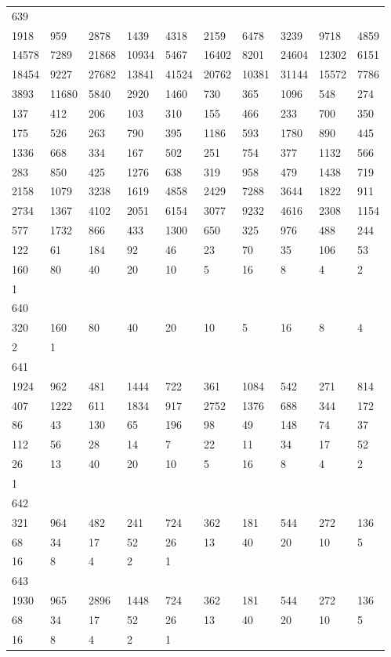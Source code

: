 \begin{longtable}{*{10}{l}}
639&&&&&&&&&\\
1918& 959& 2878& 1439& 4318& 2159& 6478& 3239& 9718& 4859\\
14578& 7289& 21868& 10934& 5467& 16402& 8201& 24604& 12302& 6151\\
18454& 9227& 27682& 13841& 41524& 20762& 10381& 31144& 15572& 7786\\
3893& 11680& 5840& 2920& 1460& 730& 365& 1096& 548& 274\\
137& 412& 206& 103& 310& 155& 466& 233& 700& 350\\
175& 526& 263& 790& 395& 1186& 593& 1780& 890& 445\\
1336& 668& 334& 167& 502& 251& 754& 377& 1132& 566\\
283& 850& 425& 1276& 638& 319& 958& 479& 1438& 719\\
2158& 1079& 3238& 1619& 4858& 2429& 7288& 3644& 1822& 911\\
2734& 1367& 4102& 2051& 6154& 3077& 9232& 4616& 2308& 1154\\
577& 1732& 866& 433& 1300& 650& 325& 976& 488& 244\\
122& 61& 184& 92& 46& 23& 70& 35& 106& 53\\
160& 80& 40& 20& 10& 5& 16& 8& 4& 2\\
1& \\

640&&&&&&&&&\\
320& 160& 80& 40& 20& 10& 5& 16& 8& 4\\
2& 1& \\

641&&&&&&&&&\\
1924& 962& 481& 1444& 722& 361& 1084& 542& 271& 814\\
407& 1222& 611& 1834& 917& 2752& 1376& 688& 344& 172\\
86& 43& 130& 65& 196& 98& 49& 148& 74& 37\\
112& 56& 28& 14& 7& 22& 11& 34& 17& 52\\
26& 13& 40& 20& 10& 5& 16& 8& 4& 2\\
1& \\

642&&&&&&&&&\\
321& 964& 482& 241& 724& 362& 181& 544& 272& 136\\
68& 34& 17& 52& 26& 13& 40& 20& 10& 5\\
16& 8& 4& 2& 1& \\

643&&&&&&&&&\\
1930& 965& 2896& 1448& 724& 362& 181& 544& 272& 136\\
68& 34& 17& 52& 26& 13& 40& 20& 10& 5\\
16& 8& 4& 2& 1& \\


\end{longtable}

